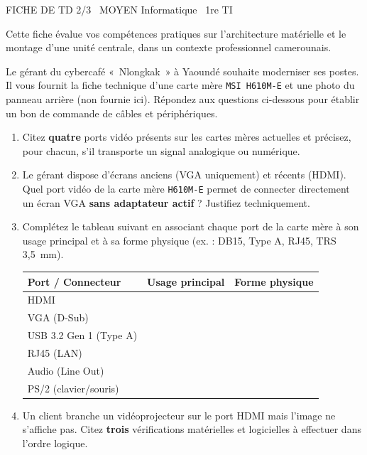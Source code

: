 \documentclass[11pt]{article}
\begin{document}
\begin{tcolorbox}[enhanced,colback=popink,colframe=popink,arc=10pt,boxrule=0pt,left=12pt,right=12pt,top=9pt,bottom=9pt]
{\color{white}\popxbold\small FICHE DE TD 2/3 \textbullet\ MOYEN \hfill Informatique \textbullet\ 1re TI\par}
\end{tcolorbox}
\vspace{4pt}
\noindent Cette fiche évalue vos compétences pratiques sur l'architecture matérielle et le montage d'une unité centrale, dans un contexte professionnel camerounais.

\begin{exercice}
Le gérant du cybercafé «~Nlongkak~» à Yaoundé souhaite moderniser ses postes. Il vous fournit la fiche technique d'une carte mère \texttt{MSI H610M-E} et une photo du panneau arrière (non fournie ici). Répondez aux questions ci-dessous pour établir un bon de commande de câbles et périphériques.
\begin{enumerate}
    \item Citez \textbf{quatre} ports vidéo présents sur les cartes mères actuelles et précisez, pour chacun, s'il transporte un signal analogique ou numérique.
    \item Le gérant dispose d'écrans anciens (VGA uniquement) et récents (HDMI). Quel port vidéo de la carte mère \texttt{H610M-E} permet de connecter directement un écran VGA \textbf{sans adaptateur actif} ? Justifiez techniquement.
    \item Complétez le tableau suivant en associant chaque port de la carte mère à son usage principal et à sa forme physique (ex. : DB15, Type A, RJ45, TRS 3,5~mm).
    \begin{tabular}{|l|l|l|}
    \hline
    \textbf{Port / Connecteur} & \textbf{Usage principal} & \textbf{Forme physique} \\ \hline
    HDMI &  &  \\ \hline
    VGA (D-Sub) &  &  \\ \hline
    USB 3.2 Gen 1 (Type A) &  &  \\ \hline
    RJ45 (LAN) &  &  \\ \hline
    Audio (Line Out) &  &  \\ \hline
    PS/2 (clavier/souris) &  &  \\ \hline
    \end{tabular}
    \item Un client branche un vidéoprojecteur sur le port HDMI mais l'image ne s'affiche pas. Citez \textbf{trois} vérifications matérielles et logicielles à effectuer dans l'ordre logique.
\end{enumerate}
\end{exercice}
\end{document}
